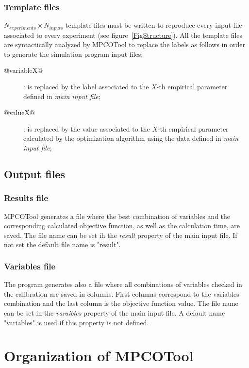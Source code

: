 \documentclass[a4paper]{report}
\begin{document}
\subsection{Template files}

$N_{experiments}\times N_{inputs}$
template files must be written to reproduce every input file associated to every experiment (see figure~\ref{FigStructure}). All the template files are syntactically analyzed by MPCOTool to replace the labels as follows in order to generate the simulation program input files:
\begin{description}
\item[@variableX@]: is replaced by the label associated to the $X$-th empirical parameter defined in \emph{main input file};
\item[@valueX@]: is replaced by the value associated to the $X$-th empirical parameter calculated by the optimization algorithm using the data defined in \emph{main input file};
\end{description}

\section{Output files}

\subsection{Results file}

MPCOTool generates a file where the best combination of variables and the
corresponding calculated objective function, as well as the calculation time,
are saved. The file name can be set ih the \emph{result} property of the main
input file. If not set the default file name is "result".

\subsection{Variables file}

The program generates also a file where all combinations
of variables checked in the calibration are saved in columns. First columns
correspond to the variables combination and the last column is the objective
function value. The file name can be set in the \emph{varaibles} property of the
main input file. A default name "variables" is used if this property is not
defined.

\chapter{Organization of MPCOTool}
\end{document}
